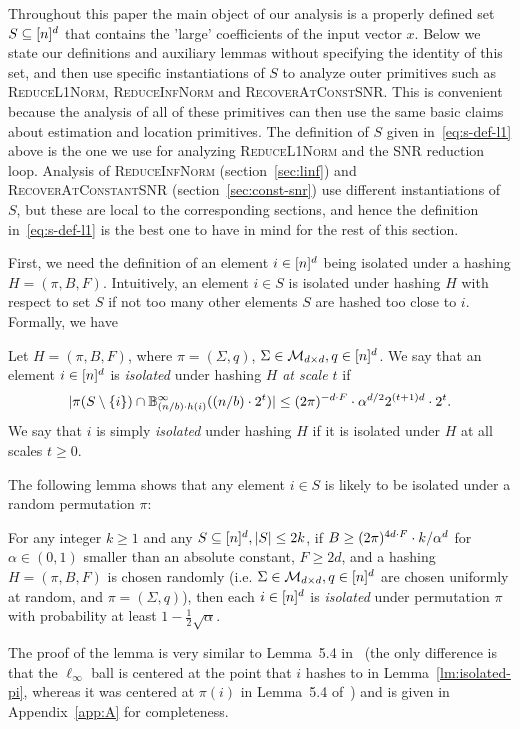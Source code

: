 Throughout this paper the main object of our analysis is a properly defined set $S\subseteq {[n]^d}$ that contains the 'large' coefficients of the input vector $x$. Below we state our definitions and auxiliary lemmas without specifying the identity of this set, and then use specific instantiations of $S$ to analyze outer primitives such as \textsc{ReduceL1Norm}, \textsc{ReduceInfNorm} and \textsc{RecoverAtConstSNR}.  This is convenient because the analysis of all of these primitives can then use the same basic claims about estimation and location primitives. The definition of $S$ given in~\eqref{eq:s-def-l1} above is the one we use for analyzing \textsc{ReduceL1Norm} and the SNR reduction loop. Analysis of \textsc{ReduceInfNorm} (section~\ref{sec:linf}) and \textsc{RecoverAtConstantSNR} (section~\ref{sec:const-snr}) use different instantiations of $S$, but these are local to the corresponding sections, and hence the definition in~\eqref{eq:s-def-l1} is the best one to have in mind for the rest of this section. 

First, we need the definition of an element $i\in {[n]^d}$ being isolated under a hashing $H=(\pi, B, F)$. Intuitively, an element $i\in S$ is isolated under hashing $H$ with respect to set $S$ if not too many other elements $S$ are hashed too close to $i$. Formally, we have
\begin{definition}\label{def:isolated}
Let $H=(\pi, B, F)$, where $\pi=(\Sigma, q)$, $\Sigma\in \mathcal{M}_{d\times d}, q\in {[n]^d}$. We say that an element $i\in {[n]^d}$ is {\em isolated} under hashing $H$ {\em at scale $t$} if
$$
|\pi(S\setminus \{i\})\cap \mathbb{B}^\infty_{(n/b)\cdot h(i)}((n/b)\cdot 2^t)|\leq (2\pi)^{-d\cdot F}\cdot \alpha^{d/2} 2^{(t+1)d}\cdot 2^{t}.
$$
We say that $i$ is simply {\em isolated} under hashing $H$ if it is isolated under $H$ at all scales $t\geq 0$.
\end{definition}
The following lemma shows that any element $i\in S$ is likely to be isolated under a random permutation $\pi$:
\begin{lemma}\label{lm:isolated-pi}
For any integer $k\geq 1$ and any $S\subseteq {[n]^d}, |S|\leq 2k$, if  $B\geq (2\pi)^{4d\cdot F}\cdot k/\alpha^d$ for $\alpha\in (0, 1)$ smaller than an absolute constant, $F\geq 2d$, and a hashing $H=(\pi, B, F)$ is chosen randomly (i.e. $\Sigma\in \mathcal{M}_{d\times d}, q\in {[n]^d}$ are chosen uniformly at random, and $\pi=(\Sigma, q)$), then each $i\in {[n]^d}$ is {\em isolated} under permutation $\pi$ with probability at least $1-\frac1{2}\sqrt{\alpha}$.
\end{lemma}
The proof of the lemma is very similar to Lemma~5.4 in~\cite{IK14a} (the only difference is that the $\ell_\infty$ ball is centered at the point that $i$ hashes to in Lemma~\ref{lm:isolated-pi}, whereas it was centered at $\pi(i)$ in Lemma~5.4 of~\cite{IK14a}) and is given in Appendix~\ref{app:A} for completeness.

